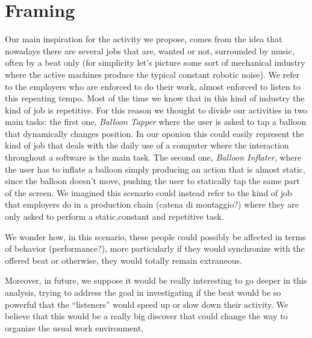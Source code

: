 
\section{Framing}

Our main inspiration for the activity we propose, comes from the idea that nowadays there are several jobs that are, wanted or not, surrounded by music, often by a beat only (for simplicity let's picture some sort of mechanical industry where the active machines produce the typical constant robotic noise). We refer to the employers who are enforced to do their work, almost enforced to listen to this repeating tempo. Most of the time we know that in this kind of industry the kind of job is repetitive. For this reason we thought to divide our activities in two main tasks: the first one, \textit{Balloon Tapper} where the user is asked to tap a balloon that dynamically changes position. In our oponion this could easily represent the kind of job that deals with the daily use of a computer where the interaction throughout a software is the main task. The second one, \textit{Balloon Inflater}, where the user has to inflate a balloon simply producing an action that is almost static, since the balloon doesn't move, pushing the user to statically tap the same part of the screen. We imagined this scenario could instead refer to the kind of job that employers do in a production chain (catena di montaggio?) where they are only asked to perform a static,constant and repetitive task. 

We wonder how, in this scenario, these people could possibly be affected in terms of behavior (performance?), more particularly if they would synchronize with the offered beat or otherwise, they would totally remain extraneous.

Moreover, in future, we suppose it would be really interesting to go deeper in this analysis, trying to address the goal in investigating if the beat would be so powerful that the ``listeners'' would speed up or slow down their activity. We believe that this would be a really big discover that could change the way to organize the usual work environment,


